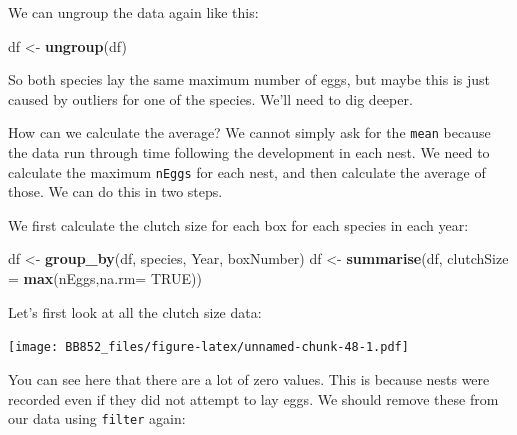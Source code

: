 \documentclass[
  a4paperpaper,
]{book}
\newenvironment{Shaded}{\begin{snugshade}}{\end{snugshade}}
\newcommand{\DataTypeTok}[1]{\textcolor[rgb]{0.13,0.29,0.53}{#1}}
\newcommand{\DecValTok}[1]{\textcolor[rgb]{0.00,0.00,0.81}{#1}}
\newcommand{\KeywordTok}[1]{\textcolor[rgb]{0.13,0.29,0.53}{\textbf{#1}}}
\newcommand{\NormalTok}[1]{#1}
\newcommand{\OperatorTok}[1]{\textcolor[rgb]{0.81,0.36,0.00}{\textbf{#1}}}
\newcommand{\OtherTok}[1]{\textcolor[rgb]{0.56,0.35,0.01}{#1}}
\newcommand{\StringTok}[1]{\textcolor[rgb]{0.31,0.60,0.02}{#1}}
\begin{document}
We can ungroup the data again like this:

\begin{Shaded}
\begin{Highlighting}[]
\NormalTok{df \textless{}{-}}\StringTok{ }\KeywordTok{ungroup}\NormalTok{(df)}
\end{Highlighting}
\end{Shaded}

So both species lay the same maximum number of eggs, but maybe this is just caused by outliers for one of the species. We'll need to dig deeper.

How can we calculate the average? We cannot simply ask for the \texttt{mean} because the data run through time following the development in each nest. We need to calculate the maximum \texttt{nEggs} for each nest, and then calculate the average of those. We can do this in two steps.

We first calculate the clutch size for each box for each species in each year:

\begin{Shaded}
\begin{Highlighting}[]
\NormalTok{df \textless{}{-}}\StringTok{ }\KeywordTok{group\_by}\NormalTok{(df, species, Year, boxNumber)}
\NormalTok{df \textless{}{-}}\StringTok{ }\KeywordTok{summarise}\NormalTok{(df, }\DataTypeTok{clutchSize =} \KeywordTok{max}\NormalTok{(nEggs,}\DataTypeTok{na.rm=} \OtherTok{TRUE}\NormalTok{))}
\end{Highlighting}
\end{Shaded}

Let's first look at all the clutch size data:

\begin{Shaded}
\end{Shaded}

\texttt{[image: BB852\_files/figure-latex/unnamed-chunk-48-1.pdf]}

You can see here that there are a lot of zero values. This is because nests were recorded even if they did not attempt to lay eggs. We should remove these from our data using \texttt{filter} again:

\begin{Shaded}
\end{Shaded}
\end{document}
